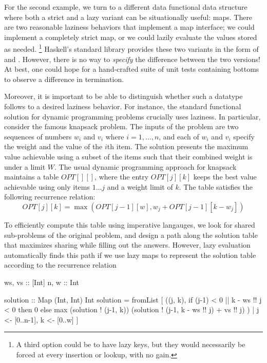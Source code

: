 \documentclass[acmsmall,review]{acmart}\settopmatter{}
\begin{document}
For the second example, we turn to a different data functional data
structure where both a strict and a lazy variant can be situationally
useful: maps. There are two reasonable laziness behaviors that
implement a map interface; we could implement a completely strict map,
or we could lazily evaluate the values stored as needed.
\footnote{A third option could be to have lazy keys, but they would
necessarily be forced at every insertion or lookup, with no gain.}
Haskell's standard library provides these two variants in the form of
 and . However, there is no way
to {\em specify} the difference between the two versions! At best, one
could hope for a hand-crafted suite of unit tests containing bottoms
to observe a difference in termination.

Moreover, it is important to be able to distinguish whether such a
datatype follows to a desired laziness behavior. For instance, the
standard functional solution for dynamic programming problems
crucially uses laziness. In particular, consider the famous knapsack
problem.
%
The inputs of the problem are two sequences of numbers $w_i$ and $v_i$
where $i = 1, \dots, n$, and each of $w_i$ and $v_i$ specify the
weight and the value of the $i$th item. The solution presents the
maximum value achievable using a subset of the items such that their
combined weight is under a limit $W$.
%
The usual dynamic programming approach for knapsack maintains a
table $OPT[][]$, where the entry $OPT[j][k]$ keeps the best value
achievable using only items $1\dots j$ and a weight limit of $k$. The
table satisfies the following recurrence relation: $$OPT[j][k]
= \max(OPT[j-1][w], w_j + OPT[j-1][k-w_j])$$

To efficiently compute this table using imperative langauges, we look
for shared sub-problems of the original problem, and design a path
along the solution table that maximizes sharing while filling out the
answers.
%
However, lazy evaluation automatically finds this path if we use lazy
maps to represent the solution table according to the recurrence
relation 
\begin{inlinecode}
ws, vs :: [Int]
n,  w  :: Int

solution :: Map (Int, Int) Int
solution = fromList [ ((j, k),
                       if (j-1) < 0 || k - ws !! j < 0
                       then 0
                       else max (solution ! (j-1, k))
                                (solution ! (j-1, k - ws !! j) + vs !! j)
                      )
                    | j <- [0..n-1], k <- [0..w] ]
\end{inlinecode}
\end{document}
